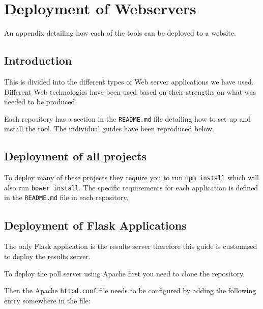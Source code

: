 \chapter{Deployment of Webservers} \label{App:Deployment of Webservers}

\begin{preamble}
An appendix detailing how each of the tools can be deployed to a website.
\end{preamble}

\section{Introduction}

This is divided into the different types of Web server applications we have used. Different Web technologies have been used based on their strengths on what was needed to be produced.

Each repository has a section in the \lstinline|README.md| file detailing how to set up and install the tool. The individual guides have been reproduced below.

\section{Deployment of all projects}

To deploy many of these projects they require you to run \lstinline|npm install| which will also run \lstinline|bower install|. The specific requirements for each application is defined in the \lstinline|README.md| file in each repository.

\section{Deployment of Flask Applications} \label{Section:Deployment Flask Applications}

The only Flask application is the results server therefore this guide is customised to deploy the results server.

To deploy the poll server using Apache first you need to clone the repository.

Then the Apache \lstinline|httpd.conf| file needs to be configured by adding the following entry somewhere in the file:

